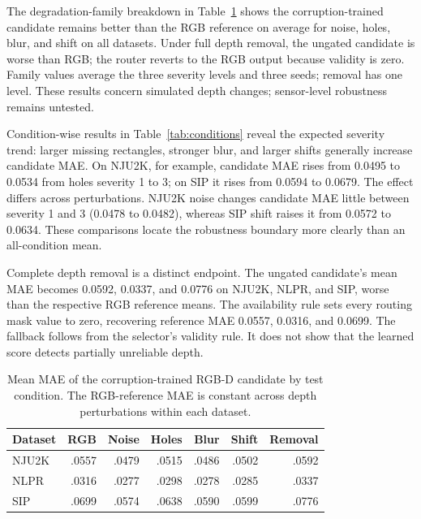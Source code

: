 \documentclass[11pt]{article}
\begin{document}
The degradation-family breakdown in Table~\ref{tab:families} shows the corruption-trained candidate remains better than the RGB reference on average for noise, holes, blur, and shift on all datasets. Under full depth removal, the ungated candidate is worse than RGB; the router reverts to the RGB output because validity is zero. Family values average the three severity levels and three seeds; removal has one level. These results concern simulated depth changes; sensor-level robustness remains untested.

Condition-wise results in Table~\ref{tab:conditions} reveal the expected severity trend: larger missing rectangles, stronger blur, and larger shifts generally increase candidate MAE. On NJU2K, for example, candidate MAE rises from 0.0495 to 0.0534 from holes severity 1 to 3; on SIP it rises from 0.0594 to 0.0679. The effect differs across perturbations. NJU2K noise changes candidate MAE little between severity 1 and 3 (0.0478 to 0.0482), whereas SIP shift raises it from 0.0572 to 0.0634. These comparisons locate the robustness boundary more clearly than an all-condition mean.

Complete depth removal is a distinct endpoint. The ungated candidate's mean MAE becomes 0.0592, 0.0337, and 0.0776 on NJU2K, NLPR, and SIP, worse than the respective RGB reference means. The availability rule sets every routing mask value to zero, recovering reference MAE 0.0557, 0.0316, and 0.0699. The fallback follows from the selector's validity rule. It does not show that the learned score detects partially unreliable depth.

\begin{table}[t]\centering\small
\caption{Mean MAE of the corruption-trained RGB-D candidate by test condition. The RGB-reference MAE is constant across depth perturbations within each dataset.}
\label{tab:families}
\begin{tabular}{lrrrrrr}\toprule Dataset & RGB & Noise & Holes & Blur & Shift & Removal\\\midrule
NJU2K & .0557 & .0479 & .0515 & .0486 & .0502 & .0592\\
NLPR & .0316 & .0277 & .0298 & .0278 & .0285 & .0337\\
SIP & .0699 & .0574 & .0638 & .0590 & .0599 & .0776\\\bottomrule\end{tabular}
\end{table}
\end{document}
